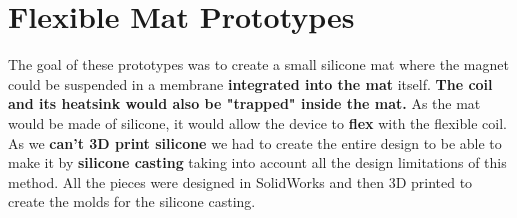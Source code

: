 \section{Flexible Mat Prototypes}
\label{sec: Flexible_Mat_Prototypes}
The goal of these prototypes was to create a small silicone mat where the magnet could be suspended in a membrane \textbf{integrated into the mat} itself.
\textbf{The coil and its heatsink would also be "trapped" inside the mat.}
As the mat would be made of silicone, it would allow the device to \textbf{flex} with the flexible coil.
As we \textbf{can't 3D print silicone} we had to create the entire design to be able to make it by \textbf{silicone casting} taking into account all the design limitations of this method.
All the pieces were designed in SolidWorks and then 3D printed to create the molds for the silicone casting. 





